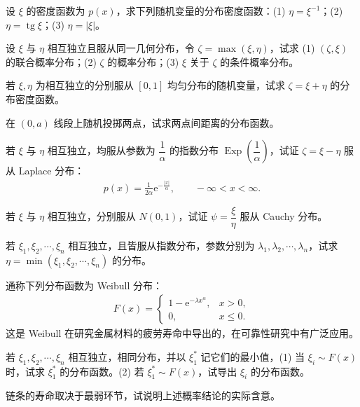 \documentclass[../../main.tex]{subfiles}
\begin{document}
\begin{exercise}\label{exercise:ch03-27}
设 $\xi$ 的密度函数为 $p(x)$，求下列随机变量的分布密度函数：(1) $\eta=\xi^{-1}$；(2) $\eta=\operatorname{tg}\xi$；(3) $\eta=|\xi|$。
\end{exercise}

\begin{exercise}\label{exercise:ch03-28}
设 $\xi$ 与 $\eta$ 相互独立且服从同一几何分布，令 $\zeta=\max(\xi,\eta)$，试求 (1) $(\zeta,\xi)$ 的联合概率分布；(2) $\zeta$ 的概率分布；(3) $\xi$ 关于 $\zeta$ 的条件概率分布。
\end{exercise}

\begin{exercise}\label{exercise:ch03-29}
若 $\xi,\eta$ 为相互独立的分别服从 $[0,1]$ 均匀分布的随机变量，试求 $\zeta=\xi+\eta$ 的分布密度函数。
\end{exercise}

\begin{exercise}\label{exercise:ch03-30}
在 $(0,a)$ 线段上随机投掷两点，试求两点间距离的分布函数。
\end{exercise}

\begin{exercise}\label{exercise:ch03-31}
若 $\xi$ 与 $\eta$ 相互独立，均服从参数为 $\dfrac{1}{\alpha}$ 的指数分布 $\operatorname{Exp}\!\left(\dfrac{1}{\alpha}\right)$，试证 $\zeta=\xi-\eta$ 服从 Laplace 分布：
\begin{align*}p(x)=\frac{1}{2\alpha}\mathrm{e}^{-\frac{|x|}{\alpha}},\qquad -\infty<x<\infty.\end{align*}
\end{exercise}

\begin{exercise}\label{exercise:ch03-32}
若 $\xi$ 与 $\eta$ 相互独立，分别服从 $N(0,1)$，试证 $\psi=\dfrac{\xi}{\eta}$ 服从 Cauchy 分布。
\end{exercise}

\begin{exercise}\label{exercise:ch03-33}
若 $\xi_1,\xi_2,\cdots,\xi_n$ 相互独立，且皆服从指数分布，参数分别为 $\lambda_1,\lambda_2,\cdots,\lambda_n$，试求 $\eta=\min(\xi_1,\xi_2,\cdots,\xi_n)$ 的分布。
\end{exercise}

\begin{exercise}\label{exercise:ch03-34}
通称下列分布函数为 Weibull 分布：
\begin{align*}F(x)=
\begin{cases}
1-\mathrm{e}^{-\lambda x^{\alpha}}, & x>0,\\
0, & x\leqslant 0.
\end{cases}\end{align*}
这是 Weibull 在研究金属材料的疲劳寿命中导出的，在可靠性研究中有广泛应用。

若 $\xi_1,\xi_2,\cdots,\xi_n$ 相互独立，相同分布，并以 $\xi_1^{*}$ 记它们的最小值，(1) 当 $\xi_i\sim F(x)$ 时，试求 $\xi_1^{*}$ 的分布函数。(2) 若 $\xi_1^{*}\sim F(x)$，试导出 $\xi_i$ 的分布函数。

链条的寿命取决于最弱环节，试说明上述概率结论的实际含意。
\end{exercise}
\end{document}
